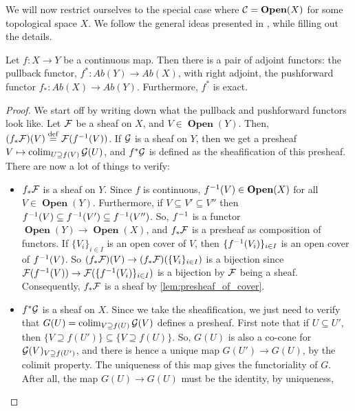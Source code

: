 \documentclass{article}
\DeclareMathOperator{\Open}{\mathbf{Open}}
\DeclareMathOperator{\colim}{colim}
\begin{document}
We will now restrict ourselves to the special case
where $\mcC = \Open(X)$ for some topological space $X$.
We follow the general ideas presented in \cite[Session 1]{Sch2020MasterClass},
while filling out the details.
\begin{prop}
    Let $f \colon X \to Y$ be a continuous map. Then there is a
    pair of adjoint functors: the pullback functor,
    $f^* \colon Ab(Y) \to Ab(X)$, with right adjoint, the pushforward functor
    $f_* \colon Ab(X) \to Ab(Y)$. Furthermore, $f^*$ is exact.
\end{prop}
\begin{proof}
    We start off by writing down what the pullback and pushforward
    functors look like.
    Let $\mathcal{F}$ be a sheaf on $X$, and $V \in \Open(Y)$. Then,
    $(f_*\mathcal{F})(V) \overset{\mathrm{def}}{=} \mathcal{F}(f^{-1}(V))$.
    If $\mathcal{G}$ is a sheaf on $Y$, then
    we get a presheaf $V \mapsto \colim_{U \supseteq f(V)} \mcG(U)$,
    and $f^*\mathcal{G}$ is defined as the sheafification of this presheaf.
    There are now a lot of things to verify:
    \begin{itemize}
        \item $f_*\mathcal{F}$ is a sheaf on $Y$. Since $f$ is continuous,
              $f\inv(V) \in \Open(X)$ for all $V\in \Open(Y)$. Furthermore,
              if $V \subseteq V' \subseteq V''$ then
              $f^{-1}(V) \subseteq f^{-1}(V') \subseteq f^{-1}(V'')$. So,
              $f^{-1}$ is a functor $\Open(Y) \to \Open(X)$, and $f_*\mathcal{F}$
              is a presheaf as composition of functors. If $\{V_i\}_{i\in I}$
              is an open cover of $V$, then $\{f^{-1}(V_i)\}_{i\in I}$
              is an open cover of $f^{-1}(V)$.
              So $(f_*\mathcal{F})(V) \to (f_*\mathcal{F})(\{V_i\}_{i\in I})$ is a bijection
              since $\mathcal{F}(f^{-1}(V)) \to \mathcal{F}(\{f^{-1}(V_i)\}_{i\in I})$
              is a bijection by $\mathcal{F}$ being a sheaf. Consequently,
              $f_*\mathcal{F}$ is a sheaf by \cref{lem:presheaf_of_cover}.
        \item $f^*\mathcal{G}$ is a sheaf on $X$. Since we take the sheafification,
              we just need to verify that $G(U) = \colim_{V \supseteq f(U)} \mcG(V)$
              defines a presheaf. First note that if $U\subseteq U'$,
              then $\{V \supseteq f(U')\} \subseteq \{V \supseteq f(U)\}$.
              So, $G(U)$ is also a co-cone for $\mathcal{G}(V)_{V \supseteq f(U')}$,
              and there is hence a unique map $G(U') \to G(U)$,
              by the colimit property. The uniqueness
              of this map gives the functoriality of $G$. After all,
              the map $G(U) \to G(U)$ must be the identity, by uniqueness,

\end{itemize}
\end{proof}
\end{document}
